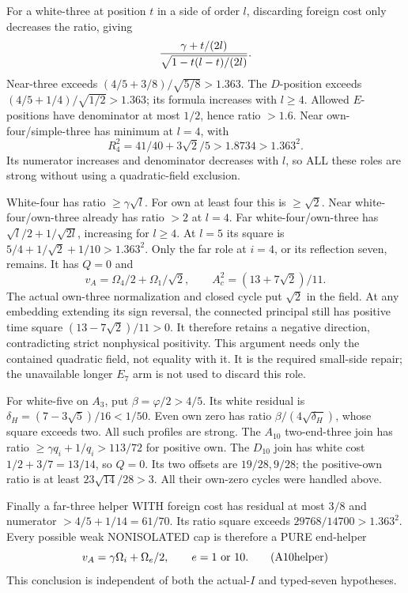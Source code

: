For a white-three at position \(t\) in a
side of order \(l\), discarding foreign
cost only decreases the ratio, giving
\[
                  {\gamma+t/(2l)\over
                            \sqrt{1-t(l-t)/(2l)}} .
\]
Near-three exceeds
\((4/5+3/8)/\sqrt{5/8}>1.363\).
The \(D\)-position exceeds
\((4/5+1/4)/\sqrt{1/2}>1.363\);
its formula increases with \(l\ge4\).
Allowed \(E\)-positions have denominator
at most \(1/2\), hence ratio \(>1.6\).
Near own-four/simple-three has minimum
at \(l=4\), with
\[
                     R_4^2=41/40+3\sqrt2/5
                             >1.8734>1.363^2 .
\]
Its numerator increases and denominator
decreases with \(l\), so ALL these roles
are strong without using a quadratic-field
exclusion.

White-four has ratio \(\ge\gamma\sqrt l\).
For own at least four this is \(\ge\sqrt2\).
Near white-four/own-three already has
ratio \(>2\) at \(l=4\).
Far white-four/own-three has
\(\sqrt l/2+1/\sqrt{2l}\), increasing for
\(l\ge4\).
At \(l=5\) its square is
\(5/4+1/\sqrt2+1/10>1.363^2\).
Only the far role at \(i=4\), or its
reflection seven, remains.
It has \(Q=0\) and
\[
 v_A=\Omega_4/2+\Omega_1/\sqrt2,\qquad
                   A_c^2=(13+7\sqrt2)/11 .
\]
The actual own-three normalization and
closed cycle put \(\sqrt2\) in the field.
At any embedding extending its sign reversal,
the connected principal still has positive
time square \((13-7\sqrt2)/11>0\).
It therefore retains a negative direction,
contradicting strict nonphysical positivity.
This argument needs only the contained
quadratic field, not equality with it.
It is the required small-side repair;
the unavailable longer \(E_7\) arm is not
used to discard this role.

For white-five on \(A_3\), put
\(\beta=\varphi/2>4/5\).
Its white residual is
\(\delta_H=(7-3\sqrt5)/16<1/50\).
Even own zero has ratio
\(\beta/(4\sqrt{\delta_H})\), whose square
exceeds two.  All such profiles are strong.
The \(A_{10}\) two-end-three join has ratio
\(\ge\gamma q_i+1/q_i>113/72\) for
positive own.
The \(D_{10}\) join has white cost
\(1/2+3/7=13/14\), so \(Q=0\).
Its two offsets are \(19/28,9/28\);
the positive-own ratio is at least
\(23\sqrt{14}/28>3\).
All their own-zero cycles were handled above.

Finally a far-three helper WITH foreign cost
has residual at most \(3/8\) and numerator
\(>4/5+1/14=61/70\).
Its ratio square exceeds
\(29768/14700>1.363^2\).
Every possible weak NONISOLATED cap is
therefore a PURE end-helper
\[
              v_A=\gamma\Omega_i+\Omega_e/2,
               \qquad e=1\ \hbox{or }10 .
\tag{A10helper}\label{eq:arithA10helper}
\]
This conclusion is independent of both
the actual-\(I\) and typed-seven hypotheses.

